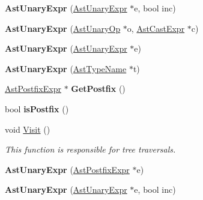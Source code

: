 \begin{DoxyCompactItemize}
\item 
\hypertarget{classAstUnaryExpr_a82859566c71d787e29263ff3ba013261}{{\bfseries Ast\-Unary\-Expr} (\hyperlink{classAstUnaryExpr}{Ast\-Unary\-Expr} $\ast$e, bool inc)}\label{classAstUnaryExpr_a82859566c71d787e29263ff3ba013261}

\item 
\hypertarget{classAstUnaryExpr_ad71de2cd2c65b31e5f5f5fde4e75fc14}{{\bfseries Ast\-Unary\-Expr} (\hyperlink{classAstUnaryOp}{Ast\-Unary\-Op} $\ast$o, \hyperlink{classAstCastExpr}{Ast\-Cast\-Expr} $\ast$c)}\label{classAstUnaryExpr_ad71de2cd2c65b31e5f5f5fde4e75fc14}

\item 
\hypertarget{classAstUnaryExpr_a22b7c004d42c54c96b40de10cc90a07e}{{\bfseries Ast\-Unary\-Expr} (\hyperlink{classAstUnaryExpr}{Ast\-Unary\-Expr} $\ast$e)}\label{classAstUnaryExpr_a22b7c004d42c54c96b40de10cc90a07e}

\item 
\hypertarget{classAstUnaryExpr_a305b745cf1449c3d3dc4e74dcd768ef1}{{\bfseries Ast\-Unary\-Expr} (\hyperlink{classAstTypeName}{Ast\-Type\-Name} $\ast$t)}\label{classAstUnaryExpr_a305b745cf1449c3d3dc4e74dcd768ef1}

\item 
\hypertarget{classAstUnaryExpr_a0892bfd110770a877a6c654875beae05}{\hyperlink{classAstPostfixExpr}{Ast\-Postfix\-Expr} $\ast$ {\bfseries Get\-Postfix} ()}\label{classAstUnaryExpr_a0892bfd110770a877a6c654875beae05}

\item 
\hypertarget{classAstUnaryExpr_a8adfdc9b288dcb86e7ed6854601eef28}{bool {\bfseries is\-Postfix} ()}\label{classAstUnaryExpr_a8adfdc9b288dcb86e7ed6854601eef28}

\item 
void \hyperlink{classAstUnaryExpr_ae35427088d6f5c889e8e80573a3750fc}{Visit} ()
\begin{DoxyCompactList}\small\item\em This function is responsible for tree traversals. \end{DoxyCompactList}\item 
\hypertarget{classAstUnaryExpr_a7afc6e7c4cf309676aa701656c70453a}{{\bfseries Ast\-Unary\-Expr} (\hyperlink{classAstPostfixExpr}{Ast\-Postfix\-Expr} $\ast$e)}\label{classAstUnaryExpr_a7afc6e7c4cf309676aa701656c70453a}

\item 
\hypertarget{classAstUnaryExpr_a82859566c71d787e29263ff3ba013261}{{\bfseries Ast\-Unary\-Expr} (\hyperlink{classAstUnaryExpr}{Ast\-Unary\-Expr} $\ast$e, bool inc)}\label{classAstUnaryExpr_a82859566c71d787e29263ff3ba013261}


\end{DoxyCompactItemize}
